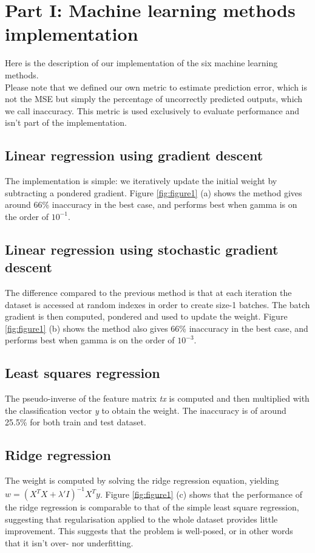 \documentclass[10pt,conference,compsocconf]{IEEEtran}
\begin{document}
\section{Part I: Machine learning methods implementation}
Here is the description of our implementation of the six machine learning methods.\\
Please note that we defined our own metric to estimate prediction error, which is not the MSE but simply the percentage of uncorrectly predicted outputs, which we call inaccuracy. 
This metric is used exclusively to evaluate performance and isn't part of the implementation.
 \subsection{Linear regression using gradient descent}
The implementation is simple: we iteratively update the initial weight by subtracting a pondered gradient.
Figure \ref{fig:figure1} (a) shows the method gives around 66\% inaccuracy in the best case, and performs best when gamma is on the order of $10^{-1}$. 
\subsection{Linear regression using stochastic gradient descent}
The difference compared to the previous method is that at each iteration the dataset is accessed at random indexes in order to
create size-1 batches. The batch gradient is then computed, pondered and used to update the weight.
Figure \ref{fig:figure1} (b) shows the method also gives 66\% inaccuracy in the best case, and performs best when gamma is on the order of $10^{-3}$. 
\subsection{Least squares regression}
The pseudo-inverse of the feature matrix \textit{tx} is computed and then multiplied with the classification vector \textit{y} to obtain the weight.
The inaccuracy is of around 25.5\% for both train and test dataset.
\subsection{Ridge regression}
The weight is computed by solving the ridge regression equation, yielding $w = (X^{T}X + \lambda'I)^{-1}X^{T}y$.
Figure \ref{fig:figure1} (c) shows that the performance of the ridge regression is comparable to that of the simple least square regression, suggesting that regularisation applied to the whole dataset provides little improvement. This suggests that the problem is well-posed, or in other words that it isn't over- nor underfitting.
\end{document}
